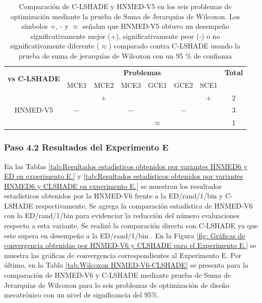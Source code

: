 \begin{table}
	\centering
	\captionsetup{width=.85\linewidth}
	\caption[Comparación de C-LSHADE y HNMED-V5 en los seis problemas de optimización mediante la prueba de Suma de Jerarquías de Wilcoxon.]{Comparación de C-LSHADE y HNMED-V5 en los seis problemas de optimización mediante la prueba de Suma de Jerarquías de Wilcoxon. Los símbolos +, - y $\approx$ señalan que HNMED-V5 obtuvo un desempeño significativamente mejor (+), significativamente peor (-) o no significativamente diferente ($\approx$) comparado contra C-LSHADE usando la prueba de suma de jerarquías de Wilcoxon con un 95 \% de confianza} \label{tab:Wilcoxon HNMED-V5-CLSHADE}
	\begin{tabular}{cccccccc}
		\multirow{2}{*}{\textbf{vs C-LSHADE}} & \multicolumn{6}{c}{\textbf{Problemas}}           & \textbf{Total}  \\
		& MCE1 & MCE2 & MCE3 & GCE1 & GCE2 & SCE1 &        \\
		\hline
		\multirow{3}{*}{HNMED-V5}    &      &  $+$    &      &      &       & $ +$    &  2      \\
		&   $-$  &      &  $ -$   &      &  $ - $  &       & 3       \\
		&      &      &       &$\approx$ &  &        &    1
	\end{tabular}
\end{table}


\subsubsection{Paso 4.2 Resultados del Experimento E}
En las Tablas \ref{tab:Resultados estadísticos obtenidos por variantes HNMED6 y ED  en experimento E.} y \ref{tab:Resultados estadísticos obtenidos por variantes HNMED6 y CLSHADE  en experimento E.} se muestran los resultados estadísticos obtenidos por la HNMED-V6 frente a la ED/rand/1/bin y C-LSHADE respectivamente. Se agrega la comparación estadística de HNMED-V6 con la ED/rand/1/bin para evidenciar la reducción del número evaluaciones respecto a esta variante. Se realizó la comparación directa con C-LSHADE ya que este supera en desempeño a la ED/rand/1/bin \cite{zapata_zapata_control_2017}. En la Figura \ref{fig: Gráficas de convergencia obtenidas por HNMED-V6 y CLSHADE para el Experimento E.} se muestra las gráficas de convergencia correspondientes al Experimento E. Por último, en la Tabla \ref{tab:Wilcoxon HNMED-V6-CLSHADE} se presenta para la comparación de HNMED-V6 y C-LSHADE mediante prueba de Suma de Jerarquías de Wilcoxon  para lo seis problemas de optimización de diseño mecatrónico con un nivel de significancia del 95\%.  

